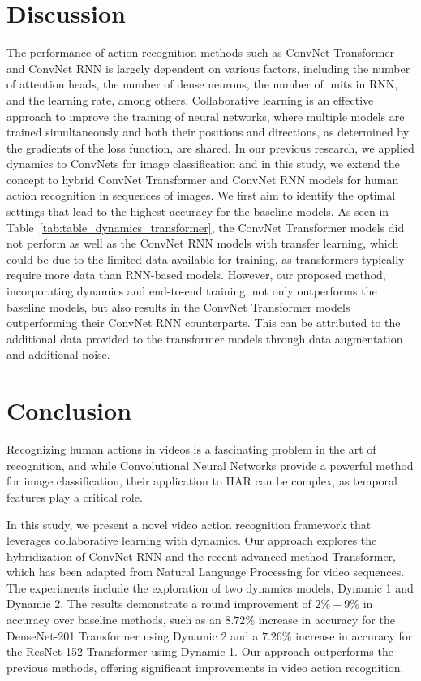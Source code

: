 \documentclass[fleqn,10pt]{wlscirep}
\begin{document}
\section{Discussion}
\label{sec:discussion}


The performance of action recognition methods such as ConvNet Transformer and ConvNet RNN is largely dependent on various factors, including the number of attention heads, the number of dense neurons, the number of units in RNN, and the learning rate, among others. Collaborative learning is an effective approach to improve the training of neural networks, where multiple models are trained simultaneously and both their positions and directions, as determined by the gradients of the loss function, are shared. In our previous research, we applied dynamics to ConvNets for image classification and in this study, we extend the concept to hybrid ConvNet Transformer and ConvNet RNN models for human action recognition in sequences of images. We first aim to identify the optimal settings that lead to the highest accuracy for the baseline models. As seen in Table~\ref{tab:table_dynamics_transformer}, the ConvNet Transformer models did not perform as well as the ConvNet RNN models with transfer learning, which could be due to the limited data available for training, as transformers typically require more data than RNN-based models. However, our proposed method, incorporating dynamics and end-to-end training, not only outperforms the baseline models, but also results in the ConvNet Transformer models outperforming their ConvNet RNN counterparts. This can be attributed to the additional data provided to the transformer models through data augmentation and additional noise.

\section{Conclusion}
\label{sec:conclusion}
Recognizing human actions in videos is a fascinating problem in the art of recognition, and while Convolutional Neural Networks provide a powerful method for image classification, their application to HAR can be complex, as temporal features play a critical role.

In this study, we present a novel video action recognition framework that leverages collaborative learning with dynamics. Our approach explores the hybridization of ConvNet RNN and the recent advanced method Transformer, which has been adapted from Natural Language Processing for video sequences. The experiments include the exploration of two dynamics models, Dynamic 1 and Dynamic 2. The results demonstrate a round improvement of $2\%-9\%$ in accuracy over baseline methods, such as an $8.72\%$ increase in accuracy for the DenseNet-201 Transformer using Dynamic 2 and a $7.26\%$ increase in accuracy for the ResNet-152 Transformer using Dynamic 1. Our approach outperforms the previous methods, offering significant improvements in video action recognition. 
\end{document}

